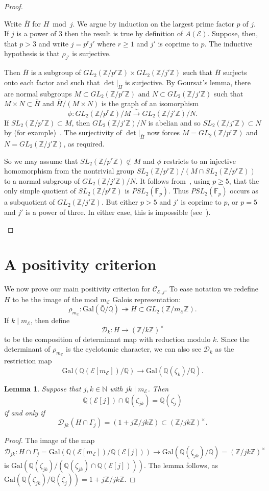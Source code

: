 \documentclass{amsart}
\theoremstyle{plain}
\newtheorem{lemma}[theorem]{Lemma}
\theoremstyle{remark}
\newcommand{\F}{\mathbb{F}}
\newcommand{\N}{\mathbb{N}}
\newcommand{\Q}{\mathbb{Q}}
\newcommand{\Z}{\mathbb{Z}}
\newcommand{\E}{\mathcal{E}}
\newcommand{\Cc}{\mathcal{C}}
\newcommand{\GalQ}{\mathrm{Gal}(\bar{\Q}/\Q)}
\newcommand{\Gal}{\mathrm{Gal}}
\newcommand{\Dc}{\mathcal{D}}
\newcommand{\onto}{\twoheadrightarrow}
\newcommand{\isomto}{\overset{\sim}{\rightarrow}}
\begin{document}
\begin{proof}
\begin{enumerate}
    Write $\bar{H}$ for $H \bmod j$. We argue by induction on the largest prime factor $p$ of $j$. If $j$ is a power of 3 then the result is true by definition of $A(\E)$. Suppose, then, that $p > 3$ and write $j = p^rj'$ where $r \ge 1$ and $j'$ is coprime to $p$. The inductive hypothesis is that $\rho_{j'}$ is surjective. 

    Then $\bar{H}$ is a subgroup of $GL_2(\Z/p^r\Z) \times GL_2(\Z/j'\Z)$ such that $\bar{H}$ surjects onto each factor and such that $\det|_{\bar{H}}$ is surjective.
    By Goursat's lemma, there are normal subgroups $M \subset GL_2(\Z/p^r\Z)$ and $N \subset GL_2(\Z/j'\Z)$ such that $M \times N \subset \bar{H}$ and $\bar{H}/(M\times N)$ is the graph of an isomorphism 
    \[\phi : GL_2(\Z/p^r\Z)/M \isomto GL_2(\Z/j'\Z)/N.\]
    If $SL_2(\Z/p^r\Z)\subset M$, then $GL_2(\Z/j'\Z)/N$ is abelian and so $SL_2(\Z/j'\Z) \subset N$ by (for example)~\cite[Lemma~7.7]{zywinaExplicitOpenImages2024}. The surjectivity of $\det|_{\bar{H}}$ now forces $M = GL_2(\Z/p^r\Z)$ and $N = GL_2(\Z/j'\Z)$, as required.

    So we may assume that $SL_2(\Z/p^r\Z) \not \subset M$ and $\phi$ restricts to an injective homomorphism from the nontrivial group $SL_2(\Z/p^r\Z)/(M \cap SL_2(\Z/p^r\Z))$ to a normal subgroup of  $GL_2(\Z/j'\Z)/N$. It follows from~\cite[IV Lemmas~2 and~3]{serre_abelian_1968}, using $p \ge 5$, that the only simple quotient of $SL_2(\Z/p^r\Z)$ is $PSL_2(\F_p)$. Thus $PSL_2(\F_p)$ occurs as a subquotient of $GL_2(\Z/j'\Z)$. But either $p > 5$ and $j'$ is coprime to $p$, or $p = 5$ and $j'$ is a power of three. In either case, this is impossible (see~\cite[IV p.\ 25]{serre_abelian_1968}).\qedhere
\end{enumerate}
\end{proof}
\section{A positivity criterion}
\label{sec:positivity}

We now prove our main positivity criterion for $\Cc_{\E,j}$. To ease notation we redefine $H$ to be the image of the mod $m_\E$ Galois representation:
\[\rho_{m_\E} : \GalQ \onto H \subset GL_2(\Z/m_\E\Z).\]
If $k \mid m_\E$, then define 
\[\Dc_k : H \to (\Z/k\Z)^\times\]
to be the composition of determinant map with reduction modulo $k$. Since the determinant of $\rho_{m_\E}$ is the cyclotomic character, we can also see $\Dc_k$ as the restriction map 
\[\Gal(\Q(\E[m_\E])/\Q) \to \Gal(\Q(\zeta_k)/\Q).\]
\begin{lemma}\label{lem:cyclotomic-lemma}
    Suppose that $j, k \in \N$ with $jk \mid m_\E$. Then 
    \[\Q(\E[j]) \cap \Q(\zeta_{jk}) = \Q(\zeta_j)\]
    if and only if 
    \[\Dc_{jk}(H \cap \Gamma_j) = (1 + j\Z/jk\Z) \subset (\Z/jk\Z)^\times.\]
\end{lemma}
\begin{proof}
    The image of the map 
    \[\Dc_{jk} : H  \cap \Gamma_j = \Gal(\Q(\E[m_\E])/\Q(\E[j])) \to \Gal(\Q(\zeta_{jk})/\Q) = (\Z/jk\Z)^\times\]
    is $\Gal(\Q(\zeta_{jk})/(\Q(\zeta_{jk}) \cap \Q(\E[j])))$. The lemma follows, as $\Gal(\Q(\zeta_{jk})/\Q(\zeta_j)) = 1 + j\Z/jk\Z$.
\end{proof}
\end{document}
